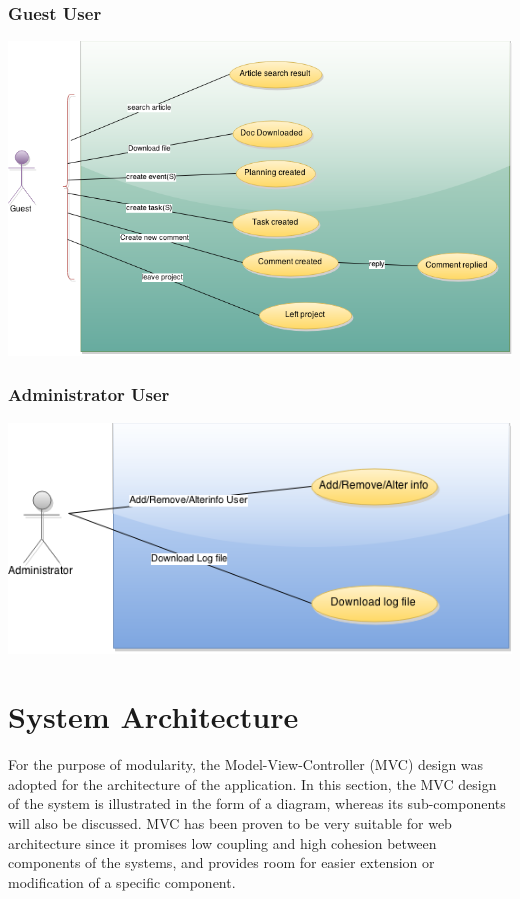 \subsubsection{Guest User} 
\begin{center}
\includegraphics[scale=0.3]{./img/dsgn_img/USECASE4.png}
	
\end{center}

\subsubsection{Administrator User} 
\begin{center}
\includegraphics[scale=0.3]{./img/dsgn_img/USECASE3.png}
	
\end{center}


\section{System Architecture} %
\label{sec:system_architecture}
For the purpose of modularity, the Model-View-Controller (MVC) design was adopted for the architecture of the application. In this section, the MVC
design of the system is illustrated in the form of a diagram, whereas its sub-components will also be discussed. MVC has been proven to be very
suitable for web architecture since it promises low coupling and high cohesion between components of the systems, and provides room for easier
extension or modification of a specific component.
